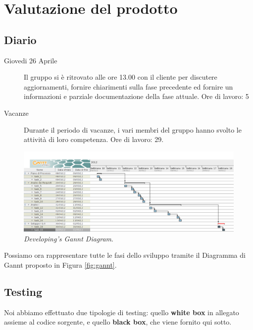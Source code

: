 \section{Valutazione del prodotto}\label{sec:valdprod}

\subsection{Diario}
\begin{description}
\item[Giovedi 26 Aprile]
Il gruppo si è ritrovato alle ore 13.00 con il cliente per discutere aggiornamenti, 
fornire chiarimenti sulla fase precedente ed fornire un informazioni e parziale 
documentazione della fase attuale.
\medskip
Ore di lavoro: 5
\bigskip

\item[Vacanze]
Durante il periodo di vacanze, i vari membri del gruppo hanno svolto le attività
di loro competenza.
\medskip
Ore di lavoro: 29.
\bigskip

\end{description}

\begin{figure}
\centering
\includegraphics[scale=0.4]{lastdiagrs/gantt.png}
\caption{\textit{Developing's Gannt Diagram}.}
\label{fig:gannt}
\end{figure}
Possiamo ora rappresentare tutte le fasi dello sviluppo tramite il Diagramma di
Gannt proposto in Figura \vref{fig:gannt}.

\subsection{Testing}
Noi abbiamo effettuato due tipologie di testing: quello \textbf{white box} in 
allegato assieme al codice sorgente, e quello \textbf{black box}, che viene fornito
qui sotto.

